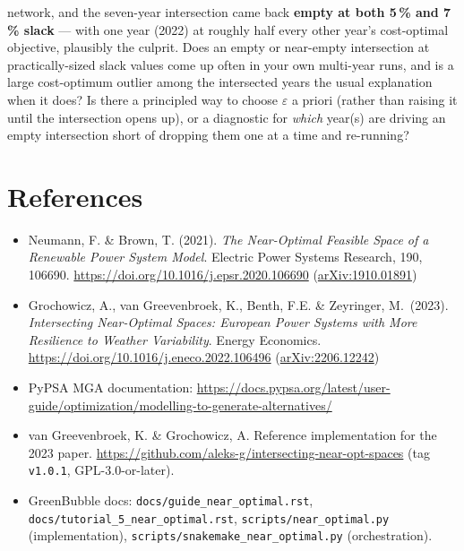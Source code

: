 \documentclass[11pt]{article}
\begin{document}
\begin{enumerate}[leftmargin=1.4em]
    network, and the seven-year intersection came back \textbf{empty at
    both 5\,\% and 7\,\% slack} --- with one year (2022) at roughly half
    every other year's cost-optimal objective, plausibly the culprit. Does
    an empty or near-empty intersection at practically-sized slack values
    come up often in your own multi-year runs, and is a large cost-optimum
    outlier among the intersected years the usual explanation when it does?
    Is there a principled way to choose $\varepsilon$ a priori (rather than
    raising it until the intersection opens up), or a diagnostic for
    \emph{which} year(s) are driving an empty intersection short of
    dropping them one at a time and re-running?
\end{enumerate}

\section*{References}
\begin{itemize}[leftmargin=1.4em]
  \item Neumann, F. \& Brown, T. (2021). \emph{The Near-Optimal Feasible
    Space of a Renewable Power System Model}. Electric Power Systems
    Research, 190, 106690.
    \url{https://doi.org/10.1016/j.epsr.2020.106690}
    (\href{https://arxiv.org/abs/1910.01891}{arXiv:1910.01891})
  \item Grochowicz, A., van Greevenbroek, K., Benth, F.E. \& Zeyringer, M.\
    (2023). \emph{Intersecting Near-Optimal Spaces: European Power Systems
    with More Resilience to Weather Variability}. Energy Economics.
    \url{https://doi.org/10.1016/j.eneco.2022.106496}
    (\href{https://arxiv.org/abs/2206.12242}{arXiv:2206.12242})
  \item PyPSA MGA documentation:
    \url{https://docs.pypsa.org/latest/user-guide/optimization/modelling-to-generate-alternatives/}
  \item van Greevenbroek, K. \& Grochowicz, A. Reference implementation for
    the 2023 paper. \url{https://github.com/aleks-g/intersecting-near-opt-spaces}
    (tag \texttt{v1.0.1}, GPL-3.0-or-later).
  \item GreenBubble docs: \texttt{docs/guide\_near\_optimal.rst},
    \texttt{docs/tutorial\_5\_near\_optimal.rst},
    \texttt{scripts/near\_optimal.py} (implementation),
    \texttt{scripts/snakemake\_near\_optimal.py} (orchestration).
\end{itemize}
\end{document}
